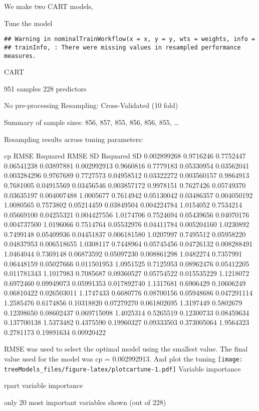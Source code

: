 \documentclass[]{article}
\begin{document}
We make two CART models,

Tune the model

\begin{verbatim}
## Warning in nominalTrainWorkflow(x = x, y = y, wts = weights, info =
## trainInfo, : There were missing values in resampled performance measures.
\end{verbatim}

CART

951 samples 228 predictors

No pre-processing Resampling: Cross-Validated (10 fold)

Summary of sample sizes: 856, 857, 855, 856, 856, 855, \ldots{}

Resampling results across tuning parameters:

cp RMSE Rsquared RMSE SD Rsquared SD 0.002899268 0.9716246 0.7752447
0.06541238 0.03897881 0.002992913 0.9660816 0.7779183 0.05330954
0.03562041 0.003284296 0.9767689 0.7727573 0.04958512 0.03322272
0.003560157 0.9864913 0.7681005 0.04915569 0.03456546 0.003857172
0.9978151 0.7627426 0.05749370 0.03635197 0.004007488 1.0005677
0.7614942 0.05130042 0.03486357 0.004050192 1.0080565 0.7573802
0.05214459 0.03849504 0.004224784 1.0154052 0.7534214 0.05669100
0.04255321 0.004427556 1.0174706 0.7524694 0.05439656 0.04070176
0.004737500 1.0196066 0.7514764 0.05532976 0.04411784 0.005204160
1.0230892 0.7499148 0.05409936 0.04451837 0.006181580 1.0207997
0.7495512 0.05958220 0.04837953 0.006518655 1.0308117 0.7448964
0.05745456 0.04726132 0.008288491 1.0464044 0.7369148 0.06873592
0.05097230 0.008861298 1.0482274 0.7357991 0.06448159 0.05027666
0.011501953 1.0951525 0.7125953 0.08962476 0.05412205 0.011781343
1.1017983 0.7085687 0.09360527 0.05754522 0.015535229 1.1218072
0.6972460 0.09949073 0.05991353 0.017892740 1.1317681 0.6906429
0.10606249 0.06810422 0.026503011 1.1747433 0.6680776 0.08700156
0.05948686 0.047291114 1.2585476 0.6174856 0.10318820 0.07279270
0.061802695 1.3197449 0.5802679 0.12398650 0.08602437 0.069715098
1.4025314 0.5265519 0.12300733 0.08459634 0.137700138 1.5373482
0.4375590 0.19960327 0.09333503 0.373005064 1.9564323 0.2781173
0.19891634 0.00920422

RMSE was used to select the optimal model using the smallest value. The
final value used for the model was cp = 0.002992913. And plot the tuning
\texttt{[image: treeModels\_files/figure-latex/plotcartune-1.pdf]}
Variable importance

rpart variable importance

only 20 most important variables shown (out of 228)
\end{document}
